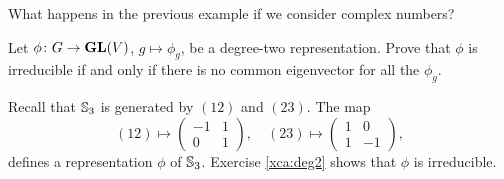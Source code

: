 What happens in the previous example if we consider complex numbers?

\begin{exercise}
  \label{xca:deg2}
  Let $\phi\colon G\to \mathbf{GL}(V)$, $g\mapsto\phi_g$, be a degree-two representation. Prove that
  $\phi$ is irreducible if and only if there is no common eigenvector for all the $\phi_g$.
\end{exercise}

\begin{example}
  Recall that $\mathbb{S}_3$ is generated by $(12)$ and $(23)$. The map 
  \[(12)\mapsto\begin{pmatrix}
    -1 & 1\\
    0 & 1
  \end{pmatrix},
  \quad
  (23)\mapsto\begin{pmatrix}
    1 & 0\\
    1 & -1
  \end{pmatrix},
  \]
  defines a representation $\phi$ of $\mathbb{S}_3$. 
  Exercise \ref{xca:deg2} shows that $\phi$ is  
  irreducible.
\end{example}